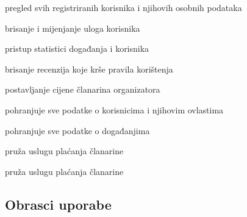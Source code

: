 \begin{packed_enum}
\begin{packed_enum}
					\item  pregled svih registriranih korisnika i njihovih osobnih podataka
					\item  brisanje i mijenjanje uloga korisnika
					\item  pristup statistici događanja i korisnika
					\item  brisanje recenzija koje krše pravila korištenja
					\item  postavljanje cijene članarina organizatora
					
				\end{packed_enum}
			
				\item  {}
				
				\begin{packed_enum}
					
					\item pohranjuje sve podatke o korisnicima i njihovim ovlastima
					\item pohranjuje sve podatke o događanjima
					
				\end{packed_enum}
				
				\item  {}
				
				\begin{packed_enum}
					
					\item pruža uslugu plaćanja članarine
					
				\end{packed_enum}
				
				\item  {}
				
				\begin{packed_enum}
					
					\item pruža uslugu plaćanja članarine
					
				\end{packed_enum}
			\end{packed_enum}
			
			\eject 
			
			
				
			\subsection{Obrasci uporabe}
				
				
